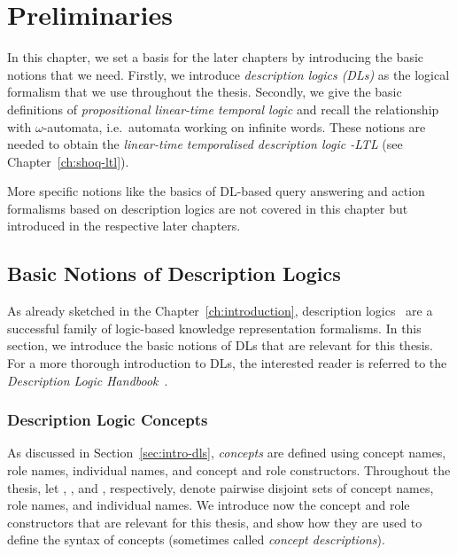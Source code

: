 \chapter{Preliminaries}\label{ch:preliminaries}

In this chapter, we set a basis for the later chapters by introducing the basic
notions that we need.  Firstly, we introduce \emph{description logics (DLs)} as
the logical formalism that we use throughout the thesis.  Secondly, we give the
basic definitions of \emph{propositional linear-time temporal logic} and recall the
relationship with $\omega$-automata, i.e.~automata working on infinite words.
These notions are needed to obtain the \emph{linear-time temporalised
description logic \SHOQ-LTL} (see Chapter~\ref{ch:shoq-ltl}).

More specific notions like the basics of DL-based query answering and action
formalisms based on description logics are not covered in this chapter but
introduced in the respective later chapters.


\section{Basic Notions of Description Logics}\label{sec:dls}

As already sketched in the Chapter~\ref{ch:introduction}, description
logics~\cite{DLhandbook-07} are a successful family of logic-based knowledge
representation formalisms.  In this section, we introduce the basic notions of
DLs that are relevant for this thesis.  For a more thorough introduction to DLs,
the interested reader is referred to the \emph{Description Logic
Handbook}~\cite{DLhandbook-07}.


\subsection{Description Logic Concepts}\label{sec:dl-concepts}

As discussed in Section~\ref{sec:intro-dls}, \emph{concepts} are defined using
concept names, role names, individual names, and concept and role constructors.
Throughout the thesis, let \NC, \NR, and \NI, respectively, denote pairwise
disjoint sets of concept names, role names, and individual names.
%
We introduce now the concept and role constructors that are relevant for this
thesis, and show how they are used to define the syntax of concepts (sometimes
called \emph{concept descriptions}).

